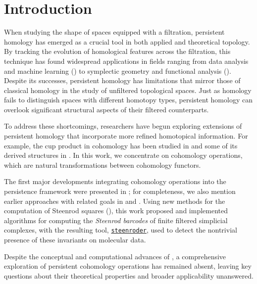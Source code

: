 
\section{Introduction} \label{s:introduction}

When studying the shape of spaces equipped with a filtration, persistent homology has emerged as a crucial tool in both applied and theoretical topology.
By tracking the evolution of homological features across the filtration, this technique has found widespread applications in fields ranging from data analysis and machine learning (\cite{carlsson2013viral, lee2017quantifying}) to symplectic geometry and functional analysis (\cite{polterovich2020persistence, medina2023fuct_top}).
Despite its successes, persistent homology has limitations that mirror those of classical homology in the study of unfiltered topological spaces.
Just as homology fails to distinguish spaces with different homotopy types, persistent homology can overlook significant structural aspects of their filtered counterparts.

To address these shortcomings, researchers have begun exploring extensions of persistent homology that incorporate more refined homotopical information.
For example, the cup product in cohomology has been studied in \cite{contessoto_et_al:LIPIcs.SoCG.2022.31, memoli2024persistent, huang2005cup, yarmola2010persistence, herscovich2018higher, contreras2022persistent} and some of its derived structures in \cite{herscovich2018higher, ginot2019distances, belchi2022persistence, zhou2023persistent, hess2024minimalmodels}.
In this work, we concentrate on cohomology operations, which are natural transformations between cohomology functors.

The first major developments integrating cohomology operations into the persistence framework were presented in \cite{medina2022per_st}; for completeness, we also mention earlier approaches with related goals in \cite{aubrey2011thesis} and \cite{postol2023persistence}.
Using new methods for the computation of Steenrod squares (\cite{medina2023fast_sq}), this work proposed and implemented algorithms for computing the \textit{Steenrod barcodes} of finite filtered simplicial complexes, with the resulting tool, \href{https://steenroder.github.io/steenroder/}{\texttt{steenroder}}, used to detect the nontrivial presence of these invariants on molecular data.

Despite the conceptual and computational advances of \cite{medina2022per_st}, a comprehensive exploration of persistent cohomology operations has remained absent, leaving key questions about their theoretical properties and broader applicability unanswered.

